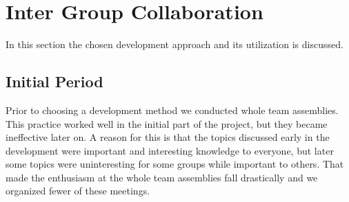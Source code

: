 \section{Inter Group Collaboration}
\label{sec:intergroup}
In this section the chosen development approach and its utilization is discussed. 

\subsection{Initial Period}
Prior to choosing a development method we conducted whole team assemblies. 
This practice worked well in the initial part of the project, but they became ineffective later on. 
A reason for this is that the topics discussed early in the development were important and interesting knowledge to everyone, but later some topics were uninteresting for some groups while important to others.
That made the enthusiasm at the whole team assemblies fall drastically and we organized fewer of these meetings.


